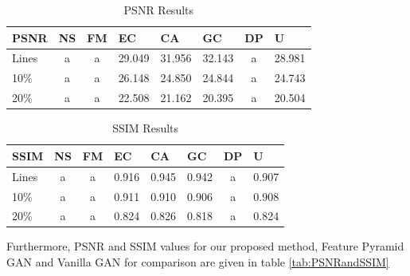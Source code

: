 \begin{table}[h!]
\centering
\begin{tabular}{@{}l|c|c|c|c|c|c|l@{}}
\textbf{PSNR} & \multicolumn{1}{l|}{NS} & \multicolumn{1}{l|}{FM} & \multicolumn{1}{l|}{EC} & \multicolumn{1}{l|}{CA} & \multicolumn{1}{l|}{GC} & \multicolumn{1}{l|}{DP} & U      \\ \midrule
Lines         & a                       & a                       & 29.049                  & 31.956                  & 32.143                  & a                       & 28.981 \\ \cmidrule(l){2-8} 
10\%          & a                       & a                       & 26.148                  & 24.850                  & 24.844                  & a                       & 24.743 \\ \cmidrule(l){2-8} 
20\%          & a                       & a                       & 22.508                  & 21.162                  & 20.395                  & a                       & 20.504 \\ \bottomrule
\end{tabular}
\caption{PSNR Results}
\label{tab:PSNRresults}
\end{table}

\begin{table}[h!]
\centering
\begin{tabular}{@{}l|c|c|c|c|c|c|l@{}}
\textbf{SSIM} & \multicolumn{1}{l|}{NS} & \multicolumn{1}{l|}{FM} & \multicolumn{1}{l|}{EC} & \multicolumn{1}{l|}{CA} & \multicolumn{1}{l|}{GC} & \multicolumn{1}{l|}{DP} & U     \\ \midrule
Lines         & a                       & a                       & 0.916                   & 0.945                   & 0.942                   & a                       & 0.907 \\ \cmidrule(l){2-8} 
10\%          & a                       & a                       & 0.911                   & 0.910                   & 0.906                   & a                       & 0.908 \\ \cmidrule(l){2-8} 
20\%          & a                       & a                       & 0.824                   & 0.826                   & 0.818                   & a                       & 0.824 \\ \bottomrule
\end{tabular}
\caption{SSIM Results}
\label{tab:SSIMresults}
\end{table}

Furthermore, PSNR and SSIM values for our proposed method, Feature Pyramid GAN and Vanilla GAN for comparison are given in table \ref{tab:PSNRandSSIM}

